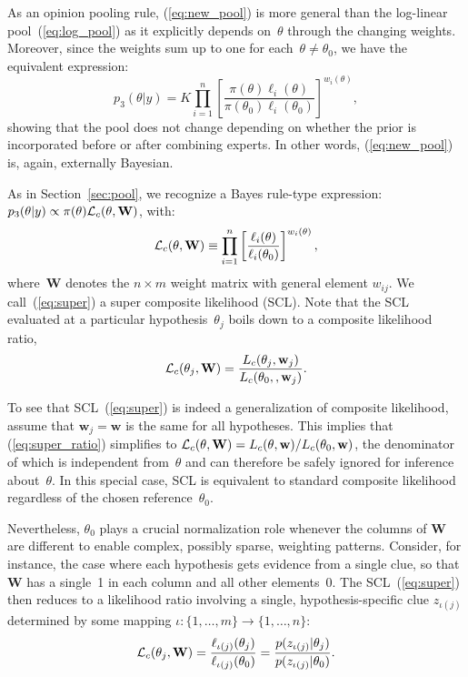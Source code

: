 \documentclass[english]{scrartcl}
\begin{document}
As an opinion pooling rule, (\ref{eq:new_pool}) is more general than the log-linear pool~(\ref{eq:log_pool}) as it explicitly depends on~$\theta$ through the changing weights. Moreover, since the weights sum up to one for each~$\theta\not=\theta_0$, we have the equivalent expression:
$$
p_3(\theta|y) 
=
K
\prod_{i=1}^n \left[
\frac{\pi(\theta)\ell_i(\theta)}{\pi(\theta_0)\ell_i(\theta_0)}
\right]^{w_i(\theta)},
$$
showing that the pool does not change depending on whether the prior is incorporated before or after combining experts. In other words, (\ref{eq:new_pool}) is, again, externally Bayesian.

As in Section~\ref{sec:pool}, we recognize a Bayes rule-type expression: $p_3(\theta|y)\propto\pi(\theta){\cal L}_c(\theta,\mathbf{W})$, with:
\begin{equation}
\label{eq:super}
{\cal L}_c(\theta,\mathbf{W})
\equiv
\prod_{i=1}^n \left[
\frac{\ell_i(\theta)}{\ell_i(\theta_0)}
\right]^{w_i(\theta)}
,
\end{equation}
where~$\mathbf{W}$ denotes the $n\times m$ weight matrix with general element $w_{ij}$. We call~(\ref{eq:super}) a super composite likelihood (SCL). Note that the SCL evaluated at a particular hypothesis~$\theta_j$ boils down to a composite likelihood ratio,
\begin{equation}
\label{eq:super_ratio}
{\cal L}_c(\theta_j,\mathbf{W}) = 
\frac{L_c(\theta_j,\mathbf{w}_j)}{L_c(\theta_0,,\mathbf{w}_j)}
.
\end{equation}

To see that SCL~(\ref{eq:super}) is indeed a generalization of composite likelihood, assume that $\mathbf{w}_j=\mathbf{w}$ is the same for all hypotheses. This implies that (\ref{eq:super_ratio}) simplifies to ${\cal L}_c(\theta,\mathbf{W})=L_c(\theta,\mathbf{w})/L_c(\theta_0,\mathbf{w})$, the denominator of which is independent from~$\theta$ and can therefore be safely ignored for inference about~$\theta$. In this special case, SCL is equivalent to standard composite likelihood regardless of the chosen reference~$\theta_0$.

Nevertheless, $\theta_0$ plays a crucial normalization role whenever the columns of $\mathbf{W}$ are different to enable complex, possibly sparse, weighting patterns. Consider, for instance, the case where each hypothesis gets evidence from a single clue, so that $\mathbf{W}$ has a single~1 in each column and all other elements~0. The SCL~(\ref{eq:super}) then reduces to a likelihood ratio involving a single, hypothesis-specific clue $z_{\iota(j)}$ determined by some mapping $\iota:\{1,\ldots,m\}\to \{1,\ldots,n\}$:
\begin{equation}
\label{eq:pdf_proj}
{\cal L}_c(\theta_j,\mathbf{W})
= \frac{\ell_{\iota(j)}(\theta_j)}{\ell_{\iota(j)}(\theta_0)}
= \frac{p(z_{\iota(j)}|\theta_j)}{p(z_{\iota(j)}|\theta_0)}
.
\end{equation}
\end{document}
